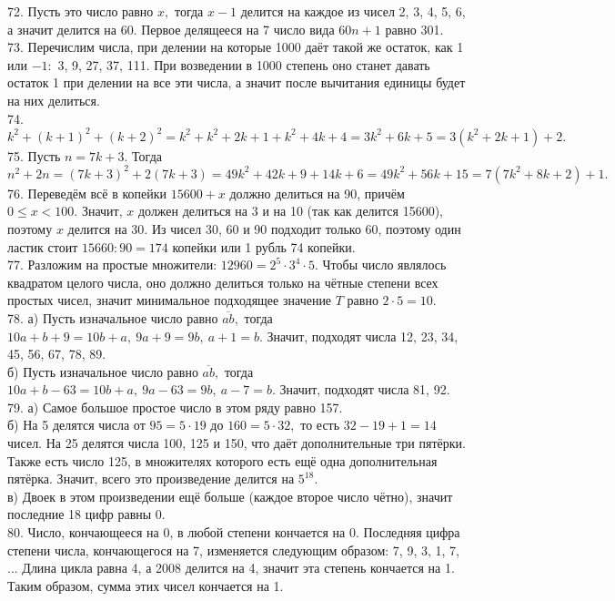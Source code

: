 72. Пусть это число равно $x,$ тогда $x-1$ делится на каждое из чисел 2, 3, 4, 5, 6, а значит делится на 60. Первое делящееся на 7 число вида $60n+1$ равно 301.\\
73. Перечислим числа, при делении на которые 1000 даёт такой же остаток, как 1 или $-1:$ 3, 9, 27, 37, 111. При возведении в 1000 степень оно станет давать остаток 1 при делении на все эти числа, а значит после вычитания единицы будет на них делиться.\\
74. $k^2+(k+1)^2+(k+2)^2=k^2+k^2+2k+1+k^2+4k+4=3k^2+6k+5=3(k^2+2k+1)+2.$\\
75. Пусть $n=7k+3.$ Тогда $n^2+2n=(7k+3)^2+2(7k+3)=49k^2+42k+9+14k+6=49k^2+56k+15=7(7k^2+8k+2)+1.$\\
76. Переведём всё в копейки $15600+x$ должно делиться на 90, причём $0\leqslant x <100.$ Значит, $x$ должен делиться на 3 и на 10 (так как делится 15600), поэтому $x$ делится на 30. Из чисел 30, 60 и 90 подходит только 60, поэтому один ластик стоит $15660:90=174$ копейки или 1 рубль 74 копейки.\\
77. Разложим на простые множители: $12960=2^5\cdot3^4\cdot5.$ Чтобы число являлось квадратом целого числа, оно должно делиться только на чётные степени всех простых чисел, значит минимальное подходящее значение $T$ равно $2\cdot5=10.$\\
78. а) Пусть изначальное число равно $\overline{ab},$ тогда $10a+b+9=10b+a,\ 9a+9=9b,\ a+1=b.$ Значит, подходят числа 12, 23, 34, 45, 56, 67, 78, 89.\\
б) Пусть изначальное число равно $\overline{ab},$ тогда $10a+b-63=10b+a,\ 9a-63=9b,\ a-7=b.$ Значит, подходят числа 81, 92.\\
79. а) Самое большое простое число в этом ряду равно 157.\\
б) На 5 делятся числа от $95=5\cdot19$ до $160=5\cdot32,$ то есть $32-19+1=14$ чисел. На 25 делятся числа 100, 125 и 150, что даёт дополнительные три пятёрки. Также есть число 125, в множителях которого есть ещё одна дополнительная пятёрка. Значит, всего это произведение делится на $5^{18}.$\\
в) Двоек в этом произведении ещё больше (каждое второе число чётно), значит последние 18 цифр равны 0.\\
80. Число, кончающееся на 0, в любой степени кончается на 0. Последняя цифра степени числа, кончающегося на 7, изменяется следующим образом: 7, 9, 3, 1, 7, ...
Длина цикла равна 4, а 2008 делится на 4, значит эта степень кончается на 1. Таким образом, сумма этих чисел кончается на 1.\\
